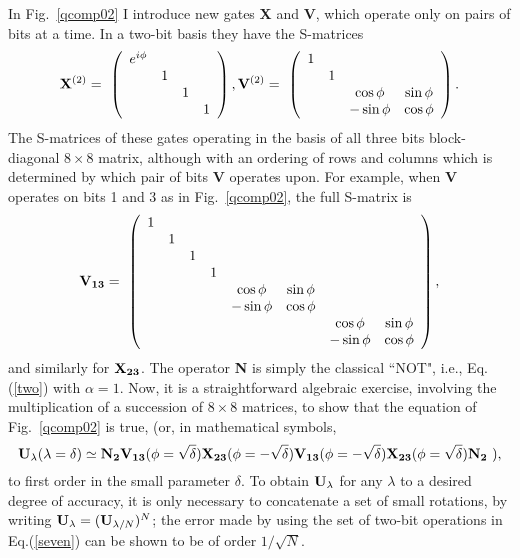 In Fig.~\ref{qcomp02} I introduce new gates {\bf X} and {\bf V}, which
operate only on pairs of bits at a time.  In a two-bit basis they have
the S-matrices
\begin{equation}
{\bf X}^{(2)}=\ \left(\begin{array}{cccc}e^{i\phi}&\ &\ &\ \\ \ &1 &\ &\ \\
\ &\ &1 &\ \\ \ &\ &\ &1\end{array}\right),
{\bf V}^{(2)}=\ \left(\begin{array}{cccc}
1 &\ &\ &\ \\ \ &1 &\ &\ \\ \ &\ &\cos\phi&\sin\phi\\ \ &\ &-\sin\phi&\cos\phi
\end{array}\right)\label{five}.
\end{equation}
The S-matrices of these gates operating in the basis of all three bits
block-diagonal $8\times 8$ matrix, although with an ordering of rows and
columns which is determined by which pair of bits {\bf V} operates
upon.  For example, when {\bf V} operates on bits 1 and 3 as in
Fig.~\ref{qcomp02}, the full S-matrix is
\begin{equation}
{\bf V_{13}}=\ \left(\begin{array}{cccccccc}
1 &\ &\ &\ &\ &\ &\ &\ \\ \ &1 &\ &\ &\ &\ &\ &\ \\ \ &\ &1 &\ &\ &\ &\ &\ \\
\ &\ &\ &1 &\ &\ &\ &\ \\ \ &\ &\ &\ &\cos\phi&\sin\phi&\ &\ \\
\ &\ &\ &\ &-\sin\phi&\cos\phi&\ &\ \\ \ &\ &\ &\ &\ &\ &\cos\phi&\sin\phi\\
\ &\ &\ &\ &\ &\ &-\sin\phi&\cos\phi\end{array}\right)\label{six},
\end{equation}
and similarly for ${\bf X_{23}}$.  The operator {\bf N} is simply the
classical ``NOT", i.e., Eq.(\ref{two}) with $\alpha=1$.  Now, it is a
straightforward algebraic exercise, involving the multiplication of
a succession of $8\times 8$ matrices,
to show that the equation of Fig.~\ref{qcomp02}
is true, (or, in mathematical symbols,
\begin{equation}
{\bf U_\lambda}(\lambda=\delta)\simeq{\bf N_2}{\bf V_{13}}(\phi=\sqrt\delta)
{\bf X_{23}}(\phi=-\sqrt\delta){\bf V_{13}}(\phi=-\sqrt\delta)
{\bf X_{23}}(\phi=\sqrt\delta){\bf N_2}\ ),\label{seven}
\end{equation}
to first order in
the small parameter $\delta$.  To obtain ${\bf U}_\lambda$ for
any $\lambda$ to a desired degree of accuracy, it is only necessary to
concatenate a set of small rotations, by writing ${\bf U}_\lambda=
({\bf U}_{\lambda/N})^N$; the error made by using the set of two-bit
operations in Eq.(\ref{seven}) can be shown to be of order
$1/\sqrt{N}$.

